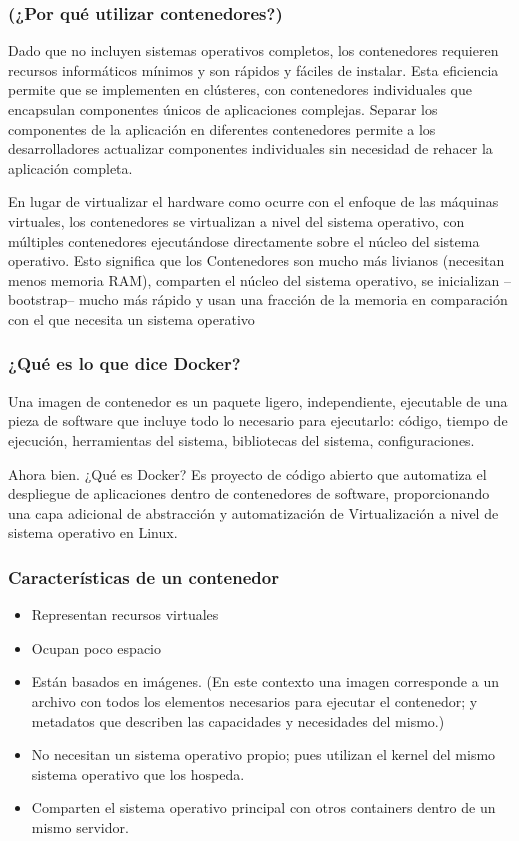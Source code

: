 \documentclass[preprint,12pt]{elsarticle}
\begin{document}
\subsubsection{\textbf{(¿Por qué utilizar contenedores?)}}
Dado que no incluyen sistemas operativos completos, los contenedores requieren recursos informáticos mínimos y son rápidos y fáciles de instalar. Esta eficiencia permite que se implementen en clústeres, con contenedores individuales que encapsulan componentes únicos de aplicaciones complejas. Separar los componentes de la aplicación en diferentes contenedores permite a los desarrolladores actualizar componentes individuales sin necesidad de rehacer la aplicación completa.


En lugar de virtualizar el hardware como ocurre con el enfoque de las máquinas virtuales, los contenedores se virtualizan a nivel del sistema operativo, con múltiples contenedores ejecutándose directamente sobre el núcleo del sistema operativo. Esto significa que los Contenedores son mucho más livianos (necesitan menos memoria RAM), comparten el núcleo del sistema operativo, se inicializan –bootstrap– mucho más rápido y usan una fracción de la memoria en comparación con el que necesita un sistema operativo


\subsubsection{\textbf{¿Qué es lo que dice Docker?}}
Una imagen de contenedor es un paquete ligero, independiente, ejecutable de una pieza de software que incluye todo lo necesario para ejecutarlo: código, tiempo de ejecución, herramientas del sistema, bibliotecas del sistema, configuraciones.

Ahora bien. ¿Qué es Docker? Es proyecto de código abierto que automatiza el despliegue de aplicaciones dentro de contenedores de software, proporcionando una capa adicional de abstracción y automatización de Virtualización a nivel de sistema operativo en Linux.



\subsubsection{\textbf{Características de un contenedor}}


\begin{itemize}

\item Representan recursos virtuales
\item  Ocupan poco espacio
\item  Están basados en imágenes. (En este contexto una imagen corresponde a un archivo con todos los elementos necesarios para ejecutar el contenedor; y metadatos que describen las capacidades y necesidades del mismo.)
\item  No necesitan un sistema operativo propio; pues utilizan el kernel del mismo sistema operativo que los hospeda.
\item  Comparten el sistema operativo principal con otros containers dentro de un mismo servidor. 

\end{itemize}
\end{document}

